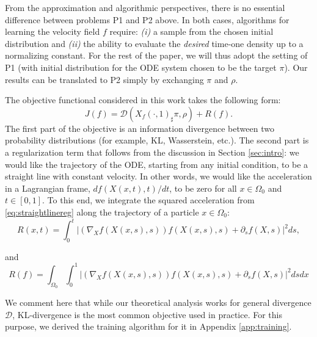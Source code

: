 From the approximation and algorithmic perspectives, there is no essential difference between problems P1 and P2 above. In both cases, algorithms for learning the velocity field $f$ require: \textit{(i)} a sample from the chosen initial distribution and \textit{(ii)} the ability to evaluate the \emph{desired} time-one density up to a normalizing constant. For the rest of the paper, we will thus adopt the setting of P1 (with initial distribution for the ODE system chosen to be the target $\pi$). Our results can be translated to P2 simply by exchanging $\pi$ and $\rho$. 

The objective functional considered in this work takes the following form: 
\begin{equation}\label{Jobjective}
J(f) = \mathcal{D}(X_f(\cdot, 1)_\sharp\pi, \rho) + R(f).
\end{equation}
The first part of the objective is an information divergence between two probability distributions (for example, KL, Wasserstein, etc.). The second part is a regularization term that follows from the discussion in Section \ref{sec:intro}: we would like the trajectory of the ODE, starting from any initial condition, to be a straight line with constant velocity. In other words, we would like the acceleration in a Lagrangian frame, $d f (X(x,t), t) / d t$, to be zero for all $x \in \Omega_0$ and $t \in [0,1]$. To this end, we integrate the squared acceleration from \eqref{eq:straightlinereg} along the trajectory of a particle $x\in\Omega_0$:
\begin{equation}
R(x,t) = \int_0^t \left \vert \left ( \nabla_X f(X(x,s),s) \right) f(X(x,s),s) +
\partial_s f(X,s) \right \vert^2 ds,    
\end{equation}

and 
\begin{equation}\label{eq:R}
R(f) = \int_{\Omega_0}\int_0^1 \left \vert \left ( \nabla_X f(X(x,s),s) \right) f(X(x,s),s) +
\partial_s f(X,s) \right \vert^2 dsdx      
\end{equation}



We comment here that while our theoretical analysis works for general divergence $\mathcal{D}$, KL-divergence is the most common objective used in practice. For this purpose, we derived the training algorithm for it in Appendix \ref{app:training}.


